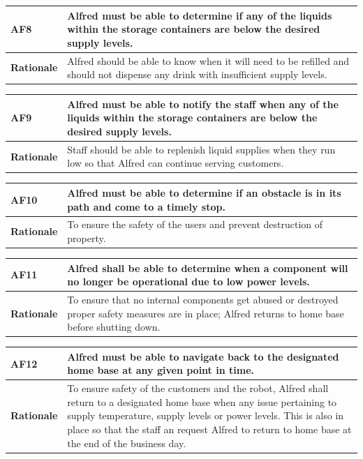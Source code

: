 \documentclass [11pt]{article}
\begin{document}
\begin{longtable}{| p{ } | p{ } | }\hline 
\rowcolor{tableCell}\textbf{AF8} & Alfred must be able to determine if any of the liquids within the storage containers are below the desired supply levels. \\ \hline
\textbf{Rationale} &  Alfred should be able to know when it will need to be refilled and should not dispense any drink with insufficient supply levels.\\ \hline 
\end{longtable}

\begin{longtable}{| p{ } | p{ } | }\hline 
\rowcolor{tableCell}\textbf{AF9} & Alfred must be able to notify the staff when any of the liquids within the storage containers are below the desired supply levels. \\ \hline 
\textbf{Rationale} &  Staff should be able to replenish liquid supplies when they run low so that Alfred can continue serving customers. \\ \hline
\end{longtable}

\begin{longtable}{| p{ } | p{ } | }\hline 
\rowcolor{tableCell}\textbf{AF10} & Alfred must be able to determine if an obstacle is in its path and come to a timely stop. \\ \hline
\textbf{Rationale} &  To ensure the safety of the users and prevent destruction of property. \\ \hline 
\end{longtable}

\begin{longtable}{| p{ } | p{ } | }\hline 
\rowcolor{tableCell}\textbf{AF11} & Alfred shall be able to determine when a component will no longer be operational due to low power levels. \\ \hline
\textbf{Rationale} &  To ensure that no internal components get abused or destroyed proper safety measures are in place; Alfred returns to home base before shutting down. \\ \hline
\end{longtable}

\begin{longtable}{| p{ } | p{ } | }\hline 
\rowcolor{tableCell}\textbf{AF12} & Alfred must be able to navigate back to the designated home base at any given point in time. \\ \hline
\textbf{Rationale} &  To ensure safety of the customers and the robot, Alfred shall return to a designated home base when any issue pertaining to supply temperature, supply levels or power levels. This is also in place so that the staff an request Alfred to return to home base at the end of the business day. \\ \hline
\end{longtable}
\end{document}
